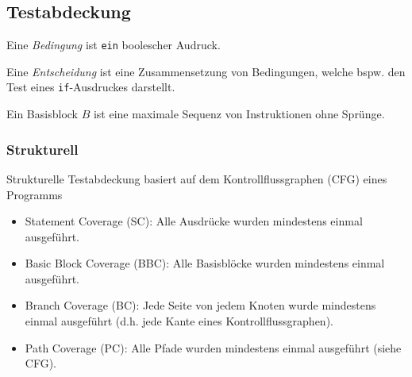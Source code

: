 \documentclass[
    ngerman,
    color=3b,
    summary,
    boxarc,
    main,
]{rubos-tuda-template}
\begin{document}
\subsection{Testabdeckung}
\begin{definition}[Bedingung]
    Eine \textit{Bedingung} ist \texttt{ein} boolescher Audruck.
\end{definition}
\begin{definition}[Entscheidung]
    Eine \textit{Entscheidung} ist eine Zusammensetzung von Bedingungen, welche bspw. den Test eines \texttt{if}-Ausdruckes darstellt.
\end{definition}
\begin{definition}
    Ein Basisblock $B$ ist eine maximale Sequenz von Instruktionen ohne Sprünge.
\end{definition}
\subsubsection{Strukturell}
Strukturelle Testabdeckung basiert auf dem Kontrollflussgraphen (CFG) eines Programms\begin{itemize}
    \item Statement Coverage (SC): Alle Ausdrücke wurden mindestens einmal ausgeführt.
    \item Basic Block Coverage (BBC): Alle Basisblöcke wurden mindestens einmal ausgeführt.
    \item Branch Coverage (BC): Jede Seite von jedem Knoten wurde mindestens einmal ausgeführt (d.h. jede Kante eines Kontrollflussgraphen).
    \item Path Coverage (PC): Alle Pfade wurden mindestens einmal ausgeführt (siehe CFG).
\end{itemize}
\end{document}
